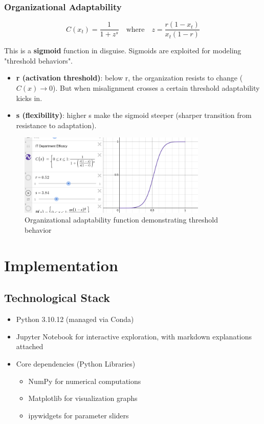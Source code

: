 \documentclass[a4paper, 11pt]{article}
\begin{document}
\subsubsection{Organizational Adaptability}
\begin{equation}
	C(x_t) = \frac{1}{1 + z^s} \quad \text{where} \quad z = \frac{r (1 - x_t)}{x_t (1 - r)}
\end{equation}

This is a \textbf{sigmoid} function in disguise. Sigmoids are exploited for modeling "threshold behaviors".

\begin{itemize}
	\item \textbf{r (activation threshold)}: below r, the organization resists to change ($C(x) \rightarrow 0$). But when misalignment crosses a certain threshold adaptability kicks in.
	\item \textbf{s (flexibility)}: higher s make the sigmoid steeper (sharper transition from resistance to adaptation).
\end{itemize}

\begin{figure}[h]
	\centering
	\includegraphics[width=0.8\textwidth]{../images/C(x)-desmos.png}
	\caption{Organizational adaptability function demonstrating threshold behavior}
\end{figure}


\section{Implementation}
\subsection{Technological Stack}
\begin{itemize}
	\item Python 3.10.12 (managed via Conda)
	\item Jupyter Notebook for interactive exploration, with markdown explanations attached
	\item Core dependencies (Python Libraries)
	      \begin{itemize}
		      \item NumPy for numerical computations
		      \item Matplotlib for visualization graphs
		      \item ipywidgets for parameter sliders
	      \end{itemize}
\end{itemize}
\end{document}
